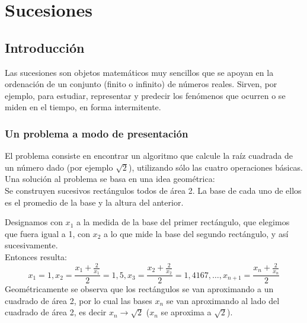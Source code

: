 \documentclass[../Teoría.root.tex]{subfiles}
\begin{document}
\section{Sucesiones}
\subsection{Introducción}
Las sucesiones son objetos matemáticos muy sencillos que se apoyan en la ordenación de un conjunto (finito o infinito) de números reales.
Sirven, por ejemplo, para estudiar, representar y predecir los fenómenos que ocurren o se miden en el tiempo, en forma intermitente.
\subsubsection{Un problema a modo de presentación}
El problema consiste en encontrar un algoritmo que calcule la raíz cuadrada de un número dado (por ejemplo \(\sqrt{2}\)), utilizando sólo las cuatro operaciones básicas.\\
Una solución al problema se basa en una idea geométrica:\\
Se construyen sucesivos rectángulos todos de área 2.
La base de cada uno de ellos es el promedio de la base y la altura del anterior.
\begin{center}
    \begin{scaletikzpicturetowidth}{\linewidth}
    \end{scaletikzpicturetowidth}
\end{center}
Designamos con \(x_1\) a la medida de la base del primer rectángulo, que elegimos que fuera igual a 1, con \(x_2\) a lo que mide la base del segundo rectángulo, y así sucesivamente.\\
Entonces resulta:
\[x_1=1,x_2=\frac{x_1+\frac{2}{x_1}}{2}=1,5,x_3=\frac{x_2+\frac{2}{x_2}}{2}=1,4167,\dots,x_{n+1}=\frac{x_n+\frac{2}{x_n}}{2}\]
Geométricamente se observa que los rectángulos se van aproximando a un cuadrado de área 2, por lo cual las bases \(x_n\) se van aproximando al lado del cuadrado de área 2, es decir \(x_n\rightarrow\sqrt{2}\) (\(x_n\) se aproxima a \(\sqrt{2}\)).\\
\end{document}
